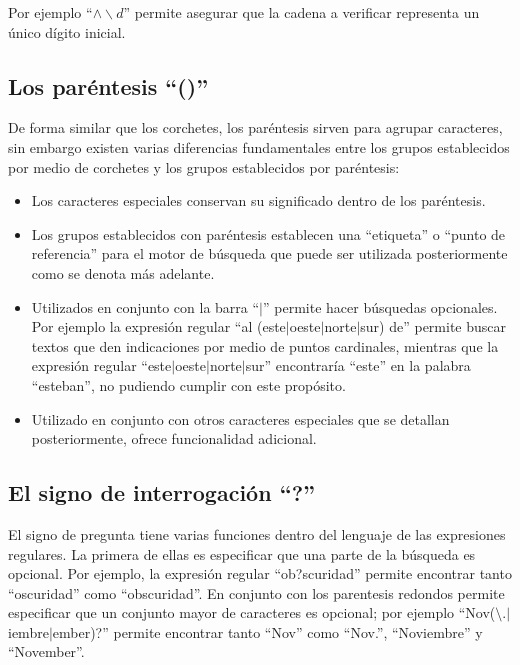 Por ejemplo ``$\wedge\backslash d$'' permite asegurar que la cadena a verificar representa un único dígito inicial.

\subsection{Los paréntesis ``()''}

De forma similar que los corchetes,
los paréntesis sirven para agrupar caracteres,
sin embargo existen varias diferencias fundamentales entre los grupos
establecidos por medio de corchetes y los grupos establecidos por paréntesis:
\begin{itemize}
	\item Los caracteres especiales conservan su significado dentro de los paréntesis.
	\item Los grupos establecidos con paréntesis establecen una ``etiqueta''
	      o ``punto de referencia'' para el motor de búsqueda que puede ser utilizada
	      posteriormente como se denota más adelante.
	\item Utilizados en conjunto con la barra ``$\mid$'' permite hacer búsquedas opcionales.
	      Por ejemplo la expresión regular ``al (este$\mid$oeste$\mid$norte$\mid$sur) de''
	      permite buscar textos que den indicaciones por medio de puntos cardinales,
	      mientras que la expresión regular ``este$\mid$oeste$\mid$norte$\mid$sur'' encontraría
	      ``este'' en la palabra ``esteban'', no pudiendo cumplir con este propósito.
	\item Utilizado en conjunto con otros caracteres especiales que se detallan posteriormente,
	      ofrece funcionalidad adicional.
\end{itemize}

\subsection{El signo de interrogación ``?''}

El signo de pregunta tiene varias funciones dentro del lenguaje de las expresiones regulares.
La primera de ellas es especificar que una parte de la búsqueda es opcional.
Por ejemplo,
la expresión regular ``ob?scuridad'' permite encontrar tanto ``oscuridad'' como ``obscuridad''.
En conjunto con los parentesis redondos permite especificar que un conjunto mayor de caracteres es opcional;
por ejemplo ``Nov($\setminus$.$\mid$iembre$\mid$ember)?'' permite encontrar tanto ``Nov'' como ``Nov.'', ``Noviembre'' y ``November''.

